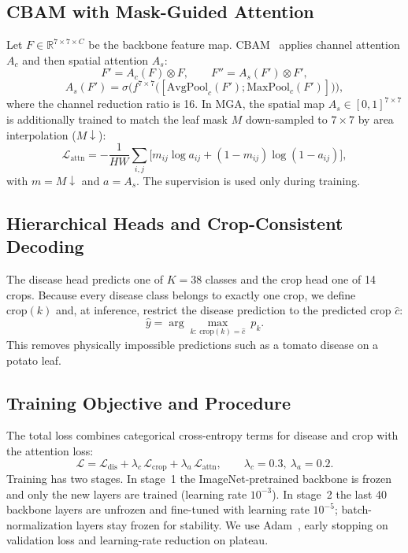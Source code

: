 \documentclass[conference]{IEEEtran}
\begin{document}
\subsection{CBAM with Mask-Guided Attention}
Let $F\in\mathbb{R}^{7\times7\times C}$ be the backbone feature map. CBAM~\cite{woo2018} applies channel attention $A_c$ and then spatial attention $A_s$:
\begin{equation}
F' = A_c(F)\otimes F,\qquad F'' = A_s(F')\otimes F',
\end{equation}
\begin{equation}
A_s(F') = \sigma\Big(f^{7\times7}\big([\mathrm{AvgPool}_c(F');\mathrm{MaxPool}_c(F')]\big)\Big),
\end{equation}
where the channel reduction ratio is 16. In MGA, the spatial map $A_s\in[0,1]^{7\times7}$ is additionally trained to match the leaf mask $M$ down-sampled to $7\times7$ by area interpolation ($M\!\downarrow$):
\begin{equation}
\mathcal{L}_{\mathrm{attn}} = -\frac{1}{HW}\sum_{i,j}\Big[m_{ij}\log a_{ij} + (1-m_{ij})\log(1-a_{ij})\Big],
\end{equation}
with $m=M\!\downarrow$ and $a=A_s$. The supervision is used only during training.

\subsection{Hierarchical Heads and Crop-Consistent Decoding}
The disease head predicts one of $K=38$ classes and the crop head one of 14 crops. Because every disease class belongs to exactly one crop, we define $\mathrm{crop}(k)$ and, at inference, restrict the disease prediction to the predicted crop $\hat{c}$:
\begin{equation}
\hat{y} = \arg\max_{k:\ \mathrm{crop}(k)=\hat{c}}\ p_k .
\label{eq:hier}
\end{equation}
This removes physically impossible predictions such as a tomato disease on a potato leaf.

\subsection{Training Objective and Procedure}
The total loss combines categorical cross-entropy terms for disease and crop with the attention loss:
\begin{equation}
\mathcal{L} = \mathcal{L}_{\mathrm{dis}} + \lambda_c\,\mathcal{L}_{\mathrm{crop}} + \lambda_a\,\mathcal{L}_{\mathrm{attn}},\qquad \lambda_c=0.3,\ \lambda_a=0.2 .
\label{eq:loss}
\end{equation}
Training has two stages. In stage~1 the ImageNet-pretrained backbone is frozen and only the new layers are trained (learning rate $10^{-3}$). In stage~2 the last 40 backbone layers are unfrozen and fine-tuned with learning rate $10^{-5}$; batch-normalization layers stay frozen for stability. We use Adam~\cite{kingma2015}, early stopping on validation loss and learning-rate reduction on plateau.
\end{document}
